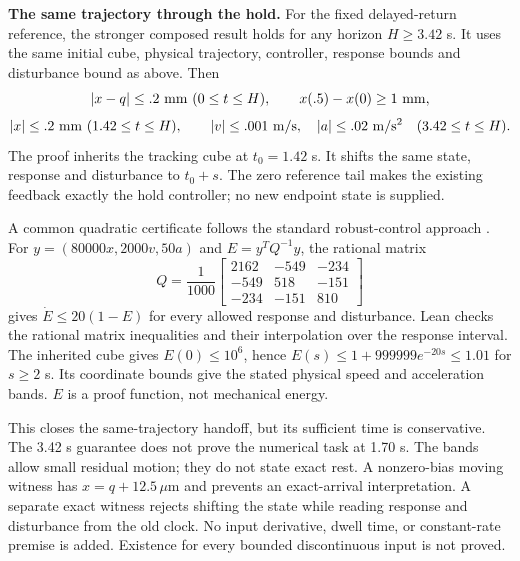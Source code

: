 \textbf{The same trajectory through the hold.}
For the fixed delayed-return reference, the stronger composed result holds for
any horizon $H\geq3.42$ s. It uses the same initial cube, physical trajectory,
controller, response bounds and disturbance bound as above. Then
\[
 |x-q|\leq.2\ {\rm mm}\ (0\leq t\leq H),\qquad
 x(.5)-x(0)\geq1\ {\rm mm},
\]
\[
 |x|\leq.2\ {\rm mm}\ (1.42\leq t\leq H),\qquad
 |v|\leq.001\ {\rm m/s},\quad |a|\leq.02\ {\rm m/s^2}
 \quad(3.42\leq t\leq H).
\]
The proof inherits the tracking cube at $t_0=1.42$ s. It shifts the same state,
response and disturbance to $t_0+s$. The zero reference tail makes the existing
feedback exactly the hold controller; no new endpoint state is supplied.

A common quadratic certificate follows the standard robust-control approach
\cite{lmibook}. For $y=(80000x,2000v,50a)$ and $E=y^TQ^{-1}y$, the rational matrix
\[
 Q=\frac1{1000}\begin{bmatrix}2162&-549&-234\\-549&518&-151\\-234&-151&810\end{bmatrix}
\]
gives $\dot E\leq20(1-E)$ for every allowed response and disturbance.
Lean checks the rational matrix inequalities and their interpolation over the
response interval. The inherited cube gives $E(0)\leq10^6$, hence
$E(s)\leq1+999999e^{-20s}\leq1.01$ for $s\geq2$ s. Its coordinate bounds give
the stated physical speed and acceleration bands. $E$ is a proof function,
not mechanical energy.

This closes the same-trajectory handoff, but its sufficient time is conservative.
The 3.42 s guarantee does not prove the numerical task at 1.70 s. The bands allow
small residual motion; they do not state exact rest. A nonzero-bias moving
witness has $x=q+12.5\,\mu$m and prevents an exact-arrival interpretation.
A separate exact witness rejects shifting the state while reading response and
disturbance from the old clock. No input derivative, dwell time, or constant-rate
premise is added. Existence for every bounded discontinuous input is not proved.

